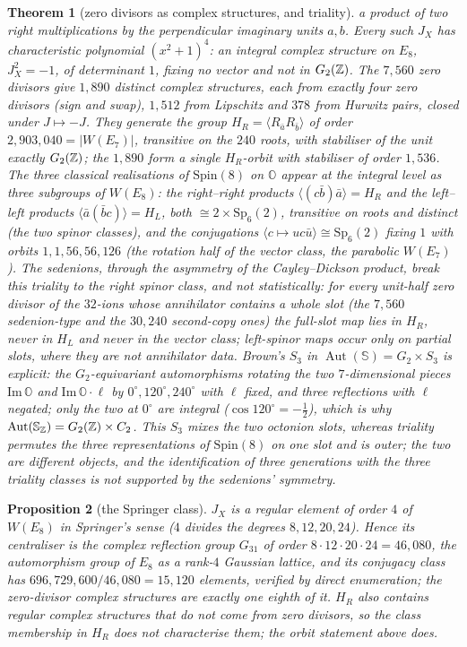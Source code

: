 \documentclass[11pt]{amsart}
\newtheorem{theorem}{Theorem}[section]
\newtheorem{proposition}[theorem]{Proposition}
\theoremstyle{definition}
\begin{document}
\begin{theorem}[zero divisors as complex structures, and triality]
a product of two right multiplications by the perpendicular imaginary units $a,b$. Every such $J_X$ has characteristic polynomial $(x^2+1)^4$: an integral complex structure on $E_8$, $J_X^2=-1$, of determinant $1$, fixing no vector and not in $G_2(\mathbb{Z})$. The $7{,}560$ zero divisors give $1{,}890$ distinct complex structures, each from exactly four zero divisors (sign and swap), $1{,}512$ from Lipschitz and $378$ from Hurwitz pairs, closed under $J\mapsto-J$. They generate the group $H_R=\langle R_{\bar a}R_{\bar b}\rangle$ of order $2{,}903{,}040=|W(E_7)|$, transitive on the $240$ roots, with stabiliser of the unit exactly $G_2(\mathbb{Z})$; the $1{,}890$ form a single $H_R$-orbit with stabiliser of order $1{,}536$. The three classical realisations of $\mathrm{Spin}(8)$ on $\mathbb O$ appear at the integral level as three subgroups of $W(E_8)$: the right--right products $\langle(c\bar b)\bar a\rangle=H_R$ and the left--left products $\langle\bar a(\bar bc)\rangle=H_L$, both $\cong2\times\mathrm{Sp}_6(2)$, transitive on roots and distinct (the two spinor classes), and the conjugations $\langle c\mapsto uc\bar u\rangle\cong\mathrm{Sp}_6(2)$ fixing $1$ with orbits $1,1,56,56,126$ (the rotation half of the vector class, the parabolic $W(E_7)$). The sedenions, through the asymmetry of the Cayley--Dickson product, break this triality to the right spinor class, and not statistically: for every unit-half zero divisor of the $32$-ions whose annihilator contains a whole slot (the $7{,}560$ sedenion-type and the $30{,}240$ second-copy ones) the full-slot map lies in $H_R$, never in $H_L$ and never in the vector class; left-spinor maps occur only on partial slots, where they are not annihilator data. Brown's $S_3$ in $\operatorname{Aut}(\mathbb S)=G_2\times S_3$ is explicit: the $G_2$-equivariant automorphisms rotating the two $7$-dimensional pieces $\mathrm{Im}\,\mathbb O$ and $\mathrm{Im}\,\mathbb O\cdot\ell$ by $0^\circ,120^\circ,240^\circ$ with $\ell$ fixed, and three reflections with $\ell$ negated; only the two at $0^\circ$ are integral ($\cos120^\circ=-\tfrac12$), which is why $\operatorname{Aut}(\mathbb S_{\mathbb{Z}})=G_2(\mathbb{Z})\times C_2$. This $S_3$ mixes the two octonion slots, whereas triality permutes the three representations of $\mathrm{Spin}(8)$ on one slot and is outer; the two are different objects, and the identification of three generations with the three triality classes is not supported by the sedenions' symmetry.
\end{theorem}
\begin{proposition}[the Springer class]\label{prop:springer}
$J_X$ is a regular element of order $4$ of $W(E_8)$ in Springer's sense ($4$ divides the degrees $8,12,20,24$). Hence its centraliser is the complex reflection group $G_{31}$ of order $8\cdot12\cdot20\cdot24=46{,}080$, the automorphism group of $E_8$ as a rank-$4$ Gaussian lattice, and its conjugacy class has $696{,}729{,}600/46{,}080=15{,}120$ elements, verified by direct enumeration; the zero-divisor complex structures are exactly one eighth of it. $H_R$ also contains regular complex structures that do not come from zero divisors, so the class membership in $H_R$ does not characterise them; the orbit statement above does.
\end{proposition}
\end{document}
